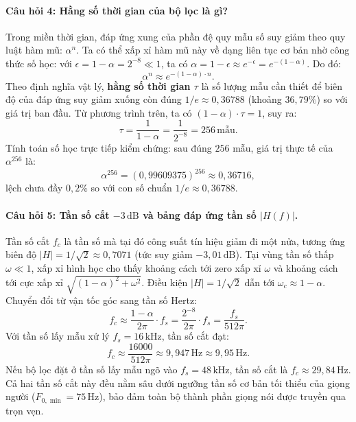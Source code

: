 \paragraph{Câu hỏi 4: Hằng số thời gian của bộ lọc là gì?}
Trong miền thời gian, đáp ứng xung của phần đệ quy mẫu số suy giảm theo quy luật hàm mũ: $\alpha^n$. Ta có thể xấp xỉ hàm mũ này về dạng liên tục cơ bản nhờ công thức số học: với $\epsilon = 1 - \alpha = 2^{-8} \ll 1$, ta có $\alpha = 1 - \epsilon \approx e^{-\epsilon} = e^{-(1-\alpha)}$. Do đó:
\begin{equation}
\alpha^n \approx e^{-(1-\alpha)\cdot n}.
\end{equation}
Theo định nghĩa vật lý, \textbf{hằng số thời gian $\tau$} là số lượng mẫu cần thiết để biên độ của đáp ứng suy giảm xuống còn đúng $1/e \approx 0{,}36788$ (khoảng $36{,}79\%$) so với giá trị ban đầu. Từ phương trình trên, ta có $(1 - \alpha)\cdot \tau = 1$, suy ra:
\begin{equation}
\tau = \frac{1}{1 - \alpha} = \frac{1}{2^{-8}} = 256\,\text{mẫu}.
\end{equation}
Tính toán số học trực tiếp kiểm chứng: sau đúng $256$ mẫu, giá trị thực tế của $\alpha^{256}$ là:
\begin{equation}
\alpha^{256} = (0{,}99609375)^{256} \approx 0{,}36716,
\end{equation}
lệch chưa đầy $0{,}2\%$ so với con số chuẩn $1/e \approx 0{,}36788$.

\paragraph{Câu hỏi 5: Tần số cắt $-3\,\text{dB}$ và bảng đáp ứng tần số $|H(f)|$.}
Tần số cắt $f_c$ là tần số mà tại đó công suất tín hiệu giảm đi một nửa, tương ứng biên độ $|H| = 1/\sqrt{2} \approx 0{,}7071$ (tức suy giảm $-3{,}01\,\text{dB}$). Tại vùng tần số thấp $\omega \ll 1$, xấp xỉ hình học cho thấy khoảng cách tới zero xấp xỉ $\omega$ và khoảng cách tới cực xấp xỉ $\sqrt{(1-\alpha)^2 + \omega^2}$. Điều kiện $|H| = 1/\sqrt{2}$ dẫn tới $\omega_c \approx 1 - \alpha$. Chuyển đổi từ vận tốc góc sang tần số Hertz:
\begin{equation}
f_c \approx \frac{1 - \alpha}{2\pi}\cdot f_s = \frac{2^{-8}}{2\pi}\cdot f_s = \frac{f_s}{512\pi}.
\end{equation}
Với tần số lấy mẫu xử lý $f_s = 16\,\text{kHz}$, tần số cắt đạt:
\begin{equation}
f_c \approx \frac{16000}{512\pi} \approx 9{,}947\,\text{Hz} \approx 9{,}95\,\text{Hz}.
\end{equation}
Nếu bộ lọc đặt ở tần số lấy mẫu ngõ vào $f_s = 48\,\text{kHz}$, tần số cắt là $f_c \approx 29{,}84\,\text{Hz}$. Cả hai tần số cắt này đều nằm sâu dưới ngưỡng tần số cơ bản tối thiểu của giọng người ($F_{0,\min} = 75\,\text{Hz}$), bảo đảm toàn bộ thành phần giọng nói được truyền qua trọn vẹn.

